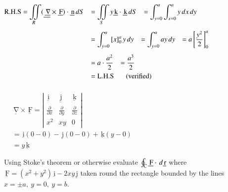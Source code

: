 \documentclass[11pt]{extarticle}
\renewcommand{\vec}[1]{\underline{\,\mathrm{#1}}}
\newcommand{\dx}{{\,dx}}
\newcommand{\dy}{{\,dy}}
\newcommand{\dS}{{\,dS}}
\newcommand{\dvr}{{\,d\vec{r}}}
\renewcommand{\i}{\vec{i}}
\renewcommand{\j}{\vec{j}}
\renewcommand{\k}{\vec{k}}
\let\oldnabla\nabla
\renewcommand{\nabla}{\vec{\oldnabla}}
\newcommand{\F}{\vec{F}}
\newcommand{\osint}[1][]{\oint\displaylimits_\mathrm{#1}}
\newcommand{\miint}{\iint\displaylimits}
\newcommand{\pp}[2][x]{\frac{\partial #2}{\partial #1}}
\begin{document}
\vspace{2ex}
\begin{minipage}[t]{0.66\linewidth}
\noindent
   \begin{adjustbox}{valign=t}
      $\begin{aligned}
         \text{R.H.S}
         = \miint_R (\nabla\times\F) \cdot \vec{n}\dS \tab
         & = \miint_S y\k \cdot \vec{k}\dS \tab
         = \int_{y=0}^a\int_{x=0}^a y\dx\dy\\[1ex]
         & = \int_{y=0}^a \left[x\right]_0^a y\dy \tab
         = \int_{y=0}^a ay \dy \tab
         = a\left[\frac{y^2}{2}\right]_0^a\\[1ex]
         & = a\cdot\frac{a^2}{2} \tab
         = \frac{a^3}{2}\\
         & = \text{L.H.S  \tabs (verified)}
      \end{aligned}$
   \end{adjustbox}
\end{minipage}\hspace{0.5ex}
\begin{minipage}[t]{0.32\linewidth}
\noindent
   \begin{adjustbox}{valign=t}
      $\begin{aligned}\\
         & \nabla \times \F  =
            \left|\begin{array}{ccc}
               \i & \j & \k \\[1ex]
               \pp[x]{} & \pp[y]{} & \pp[z]{}\\
               x^2 & xy & 0
            \end{array}\right|\\
         & = \i(0-0)-\j(0-0)+\k(y-0)\\
         & = y\k
      \end{aligned}$
   \end{adjustbox}
\end{minipage}

\pagebreak
\textbf{} Using Stoke's theorem or otherwise evaluate $\osint[C]\vec{F} \cdot \dvr$ where $\F=(x^2+y^2)\i-2xy\j$ taken round the rectangle bounded by the lines $x=\pm a,\ y=0,\ y=b$.
\end{document}
